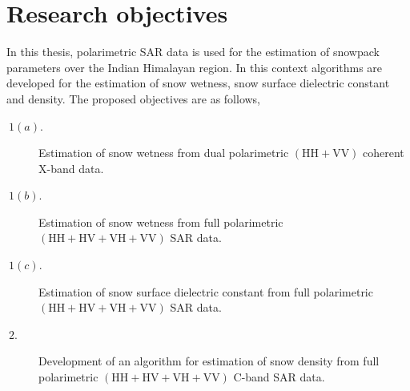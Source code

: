 \section{Research objectives}
In this thesis, polarimetric SAR data is used for the estimation of snowpack parameters over the Indian Himalayan region. In this context algorithms are developed for the estimation of snow wetness, snow surface dielectric constant and density. The proposed objectives are as follows, 

\begin{description}
	\item[$\ 1 (a).$ ] Estimation of snow wetness from dual polarimetric $(\mbox{HH}+\mbox{VV})$ coherent X-band data.
	\item[$\ 1 (b).$ ] Estimation of snow wetness from full polarimetric $(\mbox{HH}+\mbox{HV}+\mbox{VH}+\mbox{VV})$ SAR data.
	\item[$\ 1 (c).$ ] Estimation of snow surface dielectric constant from full polarimetric $(\mbox{HH}+\mbox{HV}+\mbox{VH}+\mbox{VV})$ SAR data.
	\item[$\ 2.   $ ] Development of an algorithm for estimation of snow density from full polarimetric $(\mbox{HH}+\mbox{HV}+\mbox{VH}+\mbox{VV})$ C-band SAR data.
\end{description}

%	

